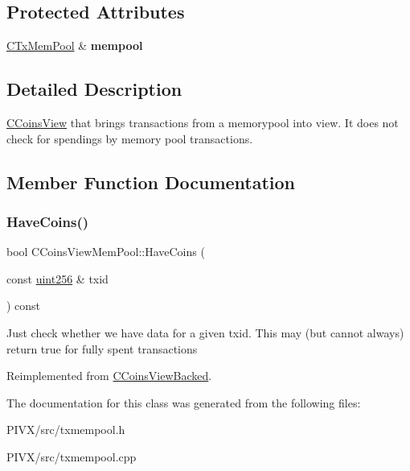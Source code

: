 \subsection*{Protected Attributes}
\begin{DoxyCompactItemize}
\item 
\mbox{\label{class_c_coins_view_mem_pool_a7a3870fc65376cb311a0b3abb28fec10}} 
\mbox{\hyperlink{class_c_tx_mem_pool}{C\+Tx\+Mem\+Pool}} \& {\bfseries mempool}
\end{DoxyCompactItemize}


\subsection{Detailed Description}
\mbox{\hyperlink{class_c_coins_view}{C\+Coins\+View}} that brings transactions from a memorypool into view. It does not check for spendings by memory pool transactions. 

\subsection{Member Function Documentation}
\mbox{\label{class_c_coins_view_mem_pool_a2c5900448dc5570053060686ad1f014b}} 
\subsubsection{\texorpdfstring{Have\+Coins()}{HaveCoins()}}
{\footnotesize\ttfamily bool C\+Coins\+View\+Mem\+Pool\+::\+Have\+Coins (\begin{DoxyParamCaption}\item[{const \mbox{\hyperlink{classuint256}{uint256}} \&}]{txid }\end{DoxyParamCaption}) const\hspace{0.3cm}{\ttfamily [virtual]}}

Just check whether we have data for a given txid. This may (but cannot always) return true for fully spent transactions 

Reimplemented from \mbox{\hyperlink{class_c_coins_view_backed_ad49041658bdec807d556e080476e6543}{C\+Coins\+View\+Backed}}.



The documentation for this class was generated from the following files\+:\begin{DoxyCompactItemize}
\item 
P\+I\+V\+X/src/txmempool.\+h\item 
P\+I\+V\+X/src/txmempool.\+cpp\end{DoxyCompactItemize}
